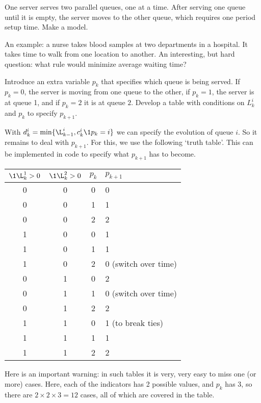 \begin{exercise}
 One
 server serves two parallel queues, one at a time.
After serving
 one queue until it is empty, the server moves to the other
 queue, which requires one period setup time.  Make a model.

An example: a nurse takes blood samples at two departments in a hospital. It takes time to walk from one location to another. An interesting, but hard question: what rule would minimize average waiting time?
\begin{hint}
  Introduce an extra variable $p_k$ that specifies which queue is being served.
  If $p_k=0$, the server is moving from one queue to the other, if $p_k=1$, the server is at queue 1, and if $p_k=2$ it is at queue $2$. Develop a table with conditions on $L_k^i$ and $p_k$ to specify $p_{k+1}$.
\end{hint}
\begin{solution}
  With $d_k^i = \min\{\L^i_{k-1}, c_k^i \1{p_k=i}\}$ we can specify the evolution of queue $i$.
  So it remains to deal with $p_{k+1}$.
  For this, we use the following `truth table'. This can be implemented in code to specify what $p_{k+1}$ has to become.
  \begin{center}
\begin{tabular}{ccc|l}
 $\1{\L^1_k > 0}$ & $\1{\L_k^2 > 0}$ & $p_k$ & $p_{k+1}$ \\ \midrule
0 & 0 & 0 & 0 \\
0 & 0 & 1 & 1 \\
0 & 0 & 2 & 2 \\
1 & 0 & 0 & 1 \\
1 & 0 & 1 & 1 \\
1 & 0 & 2 & 0 (switch over time)\\
0 & 1 & 0 & 2 \\
0 & 1 & 1 & 0 (switch over time)\\
0 & 1 & 2 & 2 \\
1 & 1 & 0 & 1 (to break ties) \\
1 & 1 & 1 & 1 \\
1 & 1 & 2 & 2 \\
\end{tabular}
  \end{center}

  Here is an important warning: in such tables it is very, very easy to miss one (or more) cases.
  Here, each of the indicators has 2 possible values, and $p_k$ has 3, so there are $2 \times 2\times 3 = 12$ cases, all of which are covered in the table.
\end{solution}
\end{exercise}


